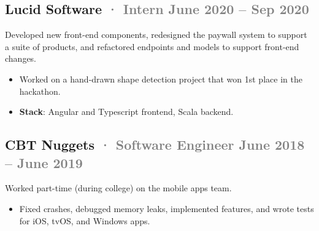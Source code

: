 \documentclass[12pt]{article} %
\providecommand{\tightlist}{%
  \setlength{\itemsep}{0pt}\setlength{\parskip}{0pt}}
\renewcommand{\emph}[1]{%
  \textcolor{gray}{#1}%
}
\begin{document}
\hypertarget{lucid-software-intern-june-2020-sep-2020}{%
\subsection{\texorpdfstring{Lucid Software \emph{· \small Intern
\hfill June 2020 -- Sep
2020}}{Lucid Software · Intern June 2020 -- Sep 2020}}\label{lucid-software-intern-june-2020-sep-2020}}

Developed new front-end components, redesigned the paywall system to
support a suite of products, and refactored endpoints and models to
support front-end changes.

\begin{itemize}
\tightlist
\item
  Worked on a hand-drawn shape detection project that won 1st place in
  the hackathon.
\item
  \textbf{Stack}: Angular and Typescript frontend, Scala backend.
\end{itemize}

\hypertarget{cbt-nuggets-software-engineer-june-2018-june-2019}{%
\subsection{\texorpdfstring{CBT Nuggets \emph{· \small Software Engineer
\hfill June 2018 -- June
2019}}{CBT Nuggets · Software Engineer June 2018 -- June 2019}}\label{cbt-nuggets-software-engineer-june-2018-june-2019}}

Worked part-time (during college) on the mobile apps team.

\begin{itemize}
\tightlist
\item
  Fixed crashes, debugged memory leaks, implemented features, and wrote
  tests for iOS, tvOS, and Windows apps.
\end{itemize}
\end{document}
